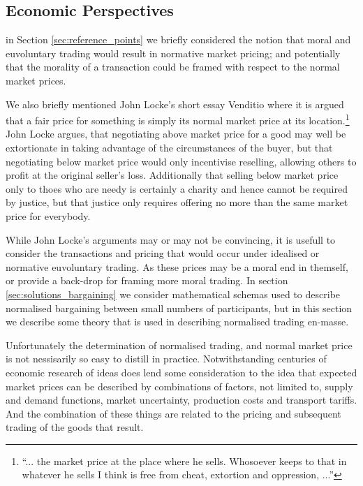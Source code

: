 \subsection{Economic Perspectives}

in Section \ref{sec:reference_points} we briefly considered the notion that moral and euvoluntary trading would result in normative market pricing; and potentially that the morality of a transaction could be framed with respect to the normal market prices.

We also briefly mentioned John Locke's short essay Venditio \cite{locke2003locke} where it is argued that a fair price for something is simply its normal market price at its location.\footnote{``... the market price at the place where he sells. Whosoever keeps to that in whatever he sells I think is free from cheat, extortion and oppression, ...''}
John Locke argues, that negotiating above market price for a good may well be extortionate in taking advantage of the circumstances of the buyer, but that negotiating below market price would only incentivise reselling, allowing others to profit at the original seller's loss.
Additionally that selling below market price only to thoes who are needy is certainly a charity and hence cannot be required by justice, but that justice only requires offering no more than the same market price for everybody.

While John Locke's arguments may or may not be convincing, it is usefull to consider the transactions and pricing that would occur under idealised or normative euvoluntary trading.
As these prices may be a moral end in themself, or provide a back-drop for framing more moral trading.
In section \ref{sec:solutions_bargaining} we consider mathematical schemas used to describe normalised bargaining between small numbers of participants, but in this section we describe some theory that is used in describing normalised trading en-masse.

Unfortunately the determination of normalised trading, and normal market price is not nessisarily so easy to distill in practice.
Notwithstanding centuries of economic research of ideas does lend some consideration to the idea that expected market prices can be described by combinations of factors, not limited to, supply and demand functions, market uncertainty, production costs and transport tariffs.
And the combination of these things are related to the pricing and subsequent trading of the goods that result.

